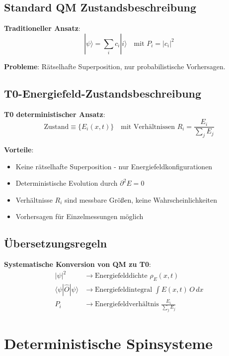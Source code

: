 \documentclass[12pt,a4paper]{article}
\newcommand{\Efield}{E}
\begin{document}
	\subsection{Standard QM Zustandsbeschreibung}
	
	\textbf{Traditioneller Ansatz}:
	\begin{equation}
		|\psi\rangle = \sum_i c_i |i\rangle \quad \text{mit } P_i = |c_i|^2
	\end{equation}
	
	\textbf{Probleme}: Rätselhafte Superposition, nur probabilistische Vorhersagen.
	
	\subsection{T0-Energiefeld-Zustandsbeschreibung}
	
	\textbf{T0 deterministischer Ansatz}:
	\begin{equation}
		\boxed{\text{Zustand} \equiv \{\Efield_i(x,t)\} \quad \text{mit Verhältnissen } R_i = \frac{\Efield_i}{\sum_j \Efield_j}}
	\end{equation}
	
	\textbf{Vorteile}: 
	\begin{itemize}
		\item Keine rätselhafte Superposition - nur Energiefeldkonfigurationen
		\item Deterministische Evolution durch $\partial^2 \Efield = 0$
		\item Verhältnisse $R_i$ sind messbare Größen, keine Wahrscheinlichkeiten
		\item Vorhersagen für Einzelmessungen möglich
	\end{itemize}
	
	\subsection{Übersetzungsregeln}
	
	\textbf{Systematische Konversion von QM zu T0}:
	\begin{align}
		|\psi|^2 &\rightarrow \text{Energiefelddichte } \rho_E(x,t) \\
		\langle\psi|\hat{O}|\psi\rangle &\rightarrow \text{Energiefeldintegral } \int \Efield(x,t) \, O \, dx \\
		P_i &\rightarrow \text{Energiefeldverhältnis } \frac{\Efield_i}{\sum_j \Efield_j}
	\end{align}
	
	\section{Deterministische Spinsysteme}
	
\end{document}
